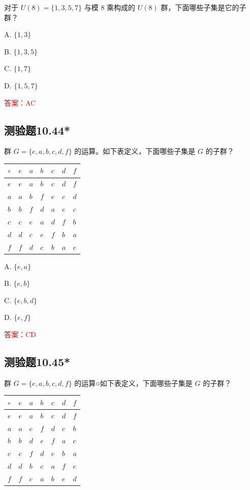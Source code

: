 \documentclass[UTF8, heading=true]{ctexart}
\begin{document}
对于 $U(8)=\{1,3,5,7\}$ 与模 8 乘构成的 $U(8)$ 群，下面哪些子集是它的子群？

A. $\{1,3\}$

B. $\{1,3,5\}$

C. $\{1,7\}$

D. $\{1,5,7\}$

\textcolor{red}{答案：AC}

\subsection{测验题10.44*}

群 $G=\{e, a, b, c, d, f\}$ 的运算。如下表定义，下面哪些子集是 $G$ 的子群？
\begin{table}[H]
  \renewcommand{\arraystretch}{1.5}
  \centering
\begin{tabular}{l|llllll}
\hline$\circ$ & $e$ & $a$ & $b$ & $c$ & $d$ & $f$ \\
\hline$e$ & $e$ & $a$ & $b$ & $c$ & $d$ & $f$ \\
$a$ & $a$ & $b$ & $f$ & $e$ & $c$ & $d$ \\
$b$ & $b$ & $f$ & $d$ & $a$ & $e$ & $c$ \\
$c$ & $c$ & $e$ & $a$ & $d$ & $f$ & $b$ \\
$d$ & $d$ & $c$ & $e$ & $f$ & $b$ & $a$ \\
$f$ & $f$ & $d$ & $c$ & $b$ & $a$ & $e$ \\
\hline
\end{tabular}
\end{table}

A. $\{e, a\}$

B. $\{e, b\}$

C. $\{e, b, d\}$

D. $\{e, f\}$

\textcolor{red}{答案：CD}

\subsection{测验题10.45*}

群 $G=\{e, a, b, c, d, f\}$ 的运算○如下表定义，下面哪些子集是 $G$ 的子群？
\begin{table}[H]
  \renewcommand{\arraystretch}{1.5}
  \centering
\begin{tabular}{l|llllll}
\hline$\circ$ & $e$ & $a$ & $b$ & $c$ & $d$ & $f$ \\
\hline$e$ & $e$ & $a$ & $b$ & $c$ & $d$ & $f$ \\
$a$ & $a$ & $e$ & $f$ & $d$ & $c$ & $b$ \\
$b$ & $b$ & $d$ & $e$ & $f$ & $a$ & $c$ \\
$c$ & $c$ & $f$ & $d$ & $e$ & $b$ & $a$ \\
$d$ & $d$ & $b$ & $c$ & $a$ & $f$ & $e$ \\
$f$ & $f$ & $c$ & $a$ & $b$ & $e$ & $d$ \\
\hline
\end{tabular}
\end{table}
\end{document}
